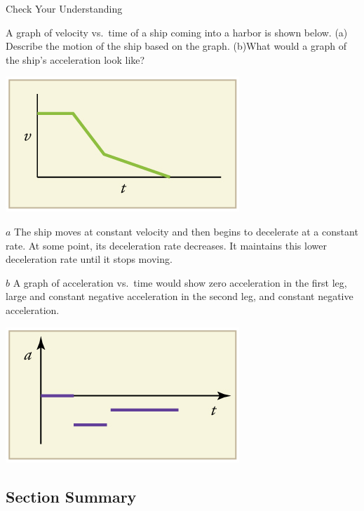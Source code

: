 \documentclass[
]{book}
\begin{document}
\hypertarget{fs-id1571006}{}
Check Your Understanding

\leavevmode\hypertarget{fs-id1429801}{}%
A graph of velocity vs.~time of a ship coming into a harbor is shown
below. (a) Describe the motion of the ship based on the graph. (b)What
would a graph of the ship's acceleration look like?

\includegraphics{images/Figure_02_07_04a.jpg}

\leavevmode\hypertarget{fs-id1658952}{}%
\(a\) The ship moves at constant velocity and then begins to decelerate
at a constant rate. At some point, its deceleration rate decreases. It
maintains this lower deceleration rate until it stops moving.

\(b\) A graph of acceleration vs.~time would show zero acceleration in
the first leg, large and constant negative acceleration in the second
leg, and constant negative acceleration.

\includegraphics{images/Figure_02_07_04b.jpg}

\hypertarget{fs-id1762928-summary}{}
\hypertarget{section-summary-7}{%
\subsection{Section Summary}\label{section-summary-7}}
\end{document}
